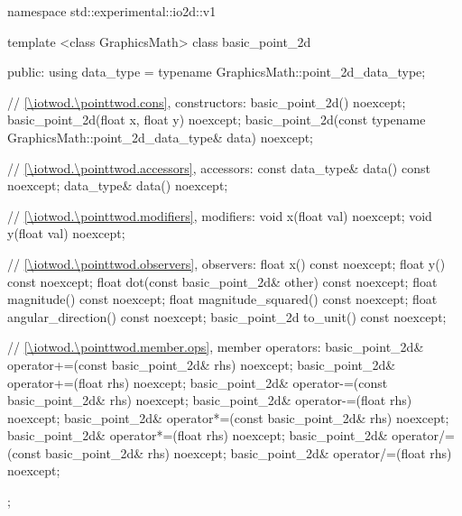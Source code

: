 \begin{codeblock}
namespace std::experimental::io2d::v1 {
  template <class GraphicsMath>
  class basic_point_2d {
  public:
    using data_type = typename GraphicsMath::point_2d_data_type;

    // \ref{\iotwod.\pointtwod.cons}, constructors:
    basic_point_2d() noexcept;
    basic_point_2d(float x, float y) noexcept;
    basic_point_2d(const typename GraphicsMath::point_2d_data_type& data) noexcept;

    // \ref{\iotwod.\pointtwod.accessors}, accessors:
    const data_type& data() const noexcept;
    data_type& data() noexcept;
    
    // \ref{\iotwod.\pointtwod.modifiers}, modifiers:
    void x(float val) noexcept;
    void y(float val) noexcept;

    // \ref{\iotwod.\pointtwod.observers}, observers:
    float x() const noexcept;
    float y() const noexcept;
    float dot(const basic_point_2d& other) const noexcept;
    float magnitude() const noexcept;
    float magnitude_squared() const noexcept;
    float angular_direction() const noexcept;
    basic_point_2d to_unit() const noexcept;

    // \ref{\iotwod.\pointtwod.member.ops}, member operators:
    basic_point_2d& operator+=(const basic_point_2d& rhs) noexcept;
    basic_point_2d& operator+=(float rhs) noexcept;
    basic_point_2d& operator-=(const basic_point_2d& rhs) noexcept;
    basic_point_2d& operator-=(float rhs) noexcept;
    basic_point_2d& operator*=(const basic_point_2d& rhs) noexcept;
    basic_point_2d& operator*=(float rhs) noexcept;
    basic_point_2d& operator/=(const basic_point_2d& rhs) noexcept;
    basic_point_2d& operator/=(float rhs) noexcept;
  };

}
\end{codeblock}
